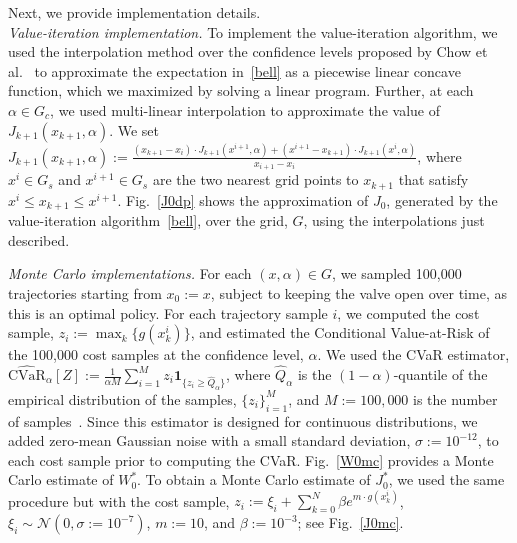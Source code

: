 \documentclass[letterpaper, 10 pt, conference]{ieeeconf}  %
\begin{document}
Next, we provide implementation details.\\
\textit{Value-iteration implementation.}
To implement the value-iteration algorithm, we used the interpolation method over the confidence levels proposed by Chow et al.~\cite{chow2015risk} 
to approximate the expectation in~\eqref{bell} as a piecewise linear concave function, which we maximized by solving a linear program.
Further, at each $\alpha \in G_c$, we used multi-linear interpolation to approximate the value of $J_{k+1}(x_{k+1}, \alpha)$.
We set $J_{k+1}(x_{k+1}, \alpha) := \frac{(x_{k+1} - x_i) \cdot J_{k+1}(x^{i+1}, \alpha) + (x^{i+1} - x_{k+1})  \cdot J_{k+1}(x^i, \alpha)}{x_{i+1}-x_i}$,
where $x^i \in G_s$ and $x^{i+1} \in G_s$ are the two nearest grid points to $x_{k+1}$ that satisfy $x^i \leq x_{k+1} \leq x^{i+1}$.
Fig.~\ref{J0dp} shows the approximation of $J_0$, generated by the value-iteration algorithm~\eqref{bell}, over the grid, $G$,
using the interpolations just described.

\textit{Monte Carlo implementations.}
For each $(x,\alpha) \in G$, we sampled 100,000 trajectories starting from $x_0 := x$, subject to keeping the valve open over time,
as this is an optimal policy.
For each trajectory sample $i$, we computed the cost sample, $z_i := \max_k\{g(x_k^i)\}$, and estimated the Conditional Value-at-Risk
of the 100,000 cost samples at the confidence level, $\alpha$. 
We used the CVaR estimator, $\widehat{\text{CVaR}}_\alpha[Z] := \frac{1}{\alpha M}\sum_{i=1}^M z_i \textbf{1}_{\{z_i\geq \hat{Q}_\alpha\}}$,
where $\hat{Q}_\alpha$ is the $(1-\alpha)$-quantile of the empirical distribution of the samples, $\{z_i\}_{i=1}^M$,
and $M := 100,000$ is the number of samples~\cite[Sec. 6.5.1]{shapiro2009lectures}.
Since this estimator is designed for continuous distributions, %
we added zero-mean Gaussian noise with a small standard deviation, $\sigma := 10^{-12}$, to each cost sample prior to computing the CVaR.
Fig.~\ref{W0mc} provides a Monte Carlo estimate of $W_0^*$.
To obtain a Monte Carlo estimate of $J_0^*$, we used the same procedure but with the cost sample, 
$z_i := \xi_i + \sum_{k=0}^N \beta e^{m\cdot g(x_k^i)}$, $\xi_i \sim \mathcal{N}(0, \sigma := 10^{-7})$,
$m := 10$, and $\beta := 10^{-3}$; see Fig.~\ref{J0mc}.
%
%
\end{document}
